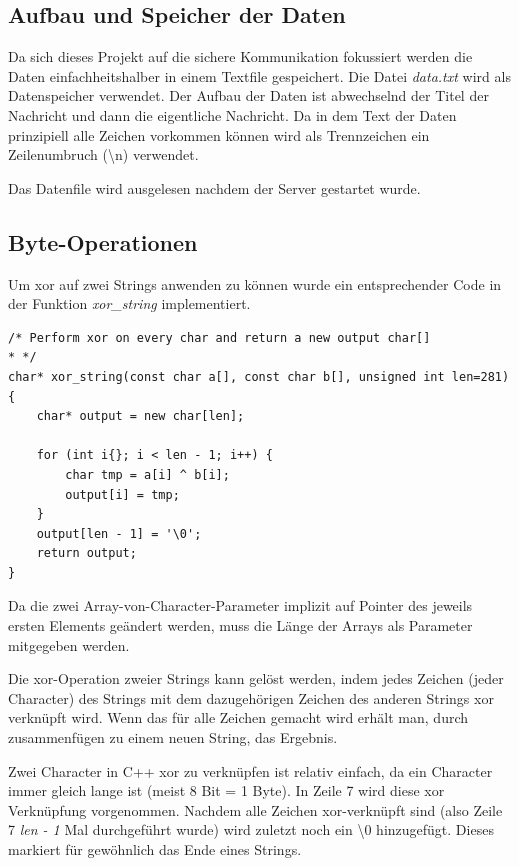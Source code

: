 \documentclass[]{article}
\begin{document}
\subsection{Aufbau und Speicher der Daten}
Da sich dieses Projekt auf die sichere Kommunikation fokussiert werden die Daten einfachheitshalber in einem Textfile gespeichert. Die Datei \textit{data.txt} wird als Datenspeicher verwendet. Der Aufbau der Daten ist abwechselnd der Titel der Nachricht und dann die eigentliche Nachricht. Da in dem Text der Daten prinzipiell alle Zeichen vorkommen können wird als Trennzeichen ein Zeilenumbruch (\textbackslash n) verwendet.

Das Datenfile wird ausgelesen nachdem der Server gestartet wurde.

\subsection{Byte-Operationen}
\label{sec:byte_operationen}
Um xor auf zwei Strings anwenden zu können wurde ein entsprechender Code in der Funktion \textit{xor\_string} implementiert.

\begin{lstlisting}
/* Perform xor on every char and return a new output char[]
* */
char* xor_string(const char a[], const char b[], unsigned int len=281) {
	char* output = new char[len];
	
	for (int i{}; i < len - 1; i++) {
		char tmp = a[i] ^ b[i];
		output[i] = tmp;
	}
	output[len - 1] = '\0';
	return output;
}
\end{lstlisting}

Da die zwei Array-von-Character-Parameter implizit auf Pointer des jeweils ersten Elements geändert werden, muss die Länge der Arrays als Parameter mitgegeben werden.

Die xor-Operation zweier Strings kann gelöst werden, indem jedes Zeichen (jeder Character) des Strings mit dem dazugehörigen Zeichen des anderen Strings xor verknüpft wird. Wenn das für alle Zeichen gemacht wird erhält man, durch zusammenfügen zu einem neuen String, das Ergebnis.

Zwei Character in C++ xor zu verknüpfen ist relativ einfach, da ein Character immer gleich lange ist (meist 8 Bit = 1 Byte). In Zeile 7 wird diese xor Verknüpfung vorgenommen. Nachdem alle Zeichen xor-verknüpft sind (also Zeile 7 \textit{len - 1} Mal durchgeführt wurde) wird zuletzt noch ein \textbackslash 0 hinzugefügt. Dieses markiert für gewöhnlich das Ende eines Strings.
\end{document}
